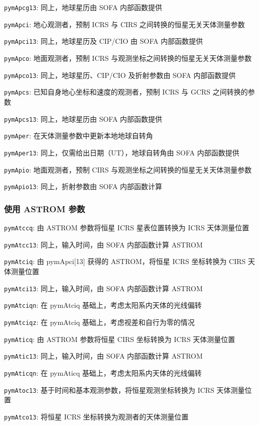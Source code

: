 \documentclass[11pt]{article}
\begin{document}
\texttt{pymApcg13}: 同上，地球星历由 SOFA 内部函数提供

\texttt{pymApci}: 地心观测者，预制 ICRS 与 CIRS 之间转换的恒星无关天体测量参数

\texttt{pymApci13}: 同上，地球星历及 CIP/CIO 由 SOFA 内部函数提供

\texttt{pymApco}: 地面观测者，预制 ICRS 与观测坐标之间转换的恒星无关天体测量参数

\texttt{pymApco13}: 同上，地球星历、CIP/CIO 及折射参数由 SOFA 内部函数提供

\texttt{pymApcs}: 已知自身地心坐标和速度的观测者，预制 ICRS 与 GCRS 之间转换的参数

\texttt{pymApcs13}: 同上，地球星历由 SOFA 内部函数提供

\texttt{pymAper}: 在天体测量参数中更新本地地球自转角

\texttt{pymAper13}: 同上，仅需给出日期（UT），地球自转角由 SOFA 内部函数提供

\texttt{pymApio}: 地面观测者，预制 CIRS 与观测坐标之间转换的恒星无关天体测量参数

\texttt{pymApio13}: 同上，折射参数由 SOFA 内部函数计算

\subsubsection{使用 ASTROM 参数}
\texttt{pymAtccq}: 由 ASTROM 参数将恒星 ICRS 星表位置转换为 ICRS 天体测量位置

\texttt{pymAtcc13}: 同上，输入时间，由 SOFA 内部函数计算 ASTROM

\texttt{pymAtciq}: 由 pymApci[13] 获得的 ASTROM，将恒星 ICRS 坐标转换为 CIRS 天体测量位置

\texttt{pymAtci13}: 同上，输入时间，由 SOFA 内部函数计算 ASTROM

\texttt{pymAtciqn}: 在 pymAtciq 基础上，考虑太阳系内天体的光线偏转

\texttt{pymAtciqz}: 在 pymAtciq 基础上，考虑视差和自行为零的情况

\texttt{pymAticq}: 由 ASTROM 参数将恒星 CIRS 坐标转换为 ICRS 天体测量位置

\texttt{pymAtic13}: 同上，输入时间，由 SOFA 内部函数计算 ASTROM

\texttt{pymAticqn}: 在 pymAticq 基础上，考虑太阳系内天体的光线偏转

\texttt{pymAtoc13}: 基于时间和基本观测参数，将恒星观测坐标转换为 ICRS 天体测量位置

\texttt{pymAtco13}: 将恒星 ICRS 坐标转换为观测者的天体测量位置
\end{document}
